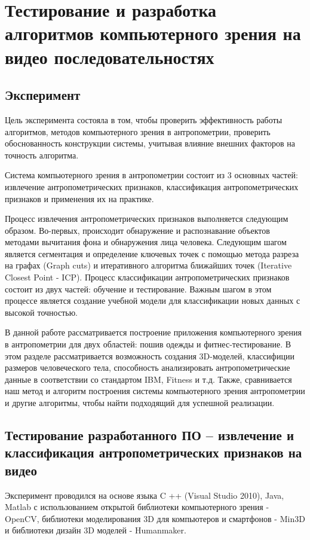 \section{Тестирование и разработка алгоритмов компьютерного зрения на видео последовательностях}
\subsection{Эксперимент}
Цель эксперимента состояла в том, чтобы проверить эффективность работы алгоритмов, методов компьютерного зрения в антропометрии, проверить обоснованность конструкции системы, учитывая влияние внешних факторов на точность алгоритма.

Система компьютерного зрения в антропометрии состоит из 3 основных частей: извлечение антропометрических признаков, классификация антропометрических признаков и применения их на практике. 

Процесс извлечения  антропометрических признаков выполняется следующим образом. Во-первых, происходит обнаружение и распознавание объектов методами вычитания фона и обнаружения лица человека. Следующим шагом является сегментация и определение ключевых точек с помощью метода разреза на графах (Graph cuts) и итеративного алгоритма ближайших точек (Iterative Closest Point - ICP). Процесс классификации антропометрических признаков состоит из двух частей: обучение и тестирование. Важным шагом в этом процессе является  создание учебной модели для классификации новых данных с высокой точностью. 

В данной работе рассматривается построение приложения компьютерного зрения в антропометрии для двух областей: пошив одежды и фитнес-тестирование. В этом разделе рассматривается возможность создания 3D-моделей, классифиции размеров человеческого тела, способность анализировать антропометрические данные в соответствии со стандартом IBM, Fitness и т.д. Также, сравнивается наш метод и алгоритм построения системы компьютерного зрения антропометрии и другие алгоритмы, чтобы найти подходящий для успешной реализации.

\subsection{Тестирование разработанного ПО – извлечение и классификация антропометрических признаков на видео}
Эксперимент проводился на основе языка C ++ (Visual Studio 2010), Java, Matlab с использованием открытой библиотеки компьютерного зрения - OpenCV, библиотеки моделирования 3D для компьютеров и смартфонов - Min3D и библиотеки дизайн 3D моделей - Humanmaker. 

